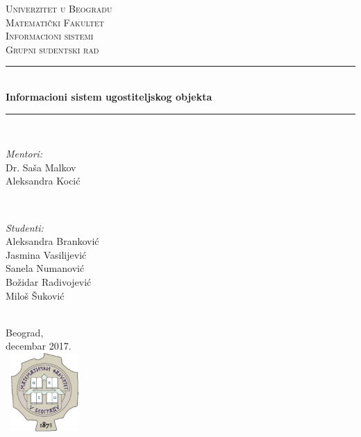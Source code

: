 \documentclass{article}
\begin{document}
\begin{titlepage}

\newcommand{\HRule}{\rule{\linewidth}{0.5mm}} 

\center 


\textsc{\LARGE Univerzitet u Beogradu\\ Matematički Fakultet }\\[1.5cm] 
\textsc{\Large Informacioni sistemi}\\[0.5cm] 
\textsc{\large Grupni sudentski rad}\\[0.5cm] 



\HRule \\[0.4cm]
{ \huge \bfseries Informacioni sistem ugostiteljskog objekta}\\[0.4cm] 
\HRule \\[1.5cm]
 


\begin{minipage}{0.4\textwidth}
\begin{flushleft} \large
\emph{Mentori:}\\
Dr. Saša Malkov\\
Aleksandra Kocić
\end{flushleft}
\end{minipage}
~
\begin{minipage}{0.4\textwidth}
\begin{flushright} \large
\emph{Studenti:} \\
Aleksandra Branković \\
Jasmina Vasilijević\\
Sanela Numanović\\
Božidar Radivojević\\
Miloš Šuković\\
\end{flushright}
\end{minipage}\\[2cm]


 
{\large Beograd,\\ decembar 2017.}\\[2cm] 
\includegraphics[width=3cm,height=3cm, keepaspectratio]{matf.jpg}\\[1cm]
 

\vfill 

\end{titlepage}
\end{document}
